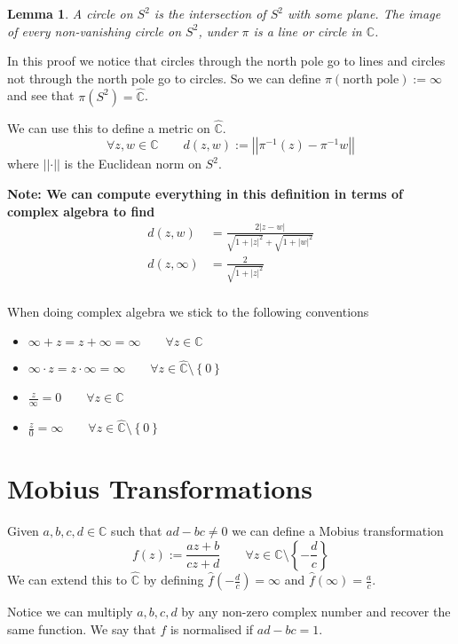 \documentclass[11pt]{article}
\newcommand{\defeq}{:=}
\newcommand{\abs}[1]{\left|#1\right|}
\newcommand{\norm}[1]{\left|\left|#1\right|\right|}
\newcommand{\C}{\mathbb{C}}
\newcommand{\mdf}[1]{{\color{red} #1}}
\newenvironment{note}
	{\begin{mdframed}[backgroundcolor=white, linecolor=red, roundcorner=5pt, linewidth=1pt]\bfseries{Note:}\normalfont}
	{\end{mdframed}}
\newtheorem{lemma}[theorem]{Lemma}
\begin{document}
\begin{lemma}
A \mdf{circle on $S^2$} is the intersection of $S^2$ with some plane.
The image of every non-vanishing circle on $S^2$, under $\pi$ is a line or circle in $\C$.
\end{lemma}

In this proof we notice that circles through the north pole go to lines and circles not through the north pole go to circles.
So we can define $\pi(\text{north pole})\defeq\infty$ and see that $\pi(S^2)=\hat{\C}$.

We can use this to define a metric on $\hat{\C}$.
\[
	\forall z, w\in \C \quad\quad d(z, w)\defeq\norm{\pi^{-1}(z) - \pi^{-1}w}
\]
where $\norm{\cdot}$ is the Euclidean norm on $S^2$.

\begin{note}
We can compute everything in this definition in terms of complex algebra to find
\begin{align*}
	d(z, w) &= \frac{2\abs{z-w}}{\sqrt{1+\abs{z}^2}+\sqrt{1+\abs{w}^2}}\\	
	d(z, \infty) &= \frac{2}{\sqrt{1+\abs{z}^2}}\\	
\end{align*}
\end{note}
When doing complex algebra we stick to the following conventions
\begin{itemize}
	\item $\infty + z = z + \infty = \infty \quad\quad\forall z\in\C$
	\item $\infty \cdot z = z \cdot \infty = \infty \quad\quad\forall z\in\hat{\C}\setminus\left\{0\right\}$
	\item $\frac{z}{\infty}=0 \quad\quad\forall z\in\C$
	\item $\frac{z}{0}=\infty \quad\quad\forall z\in\hat{\C}\setminus\left\{0\right\}$
\end{itemize}
\section{Mobius Transformations}

Given $a, b, c, d\in \C$ such that $ad-bc\neq 0$ we can define a \mdf{Mobius transformation}
\[
	f(z)\defeq\frac{az+b}{cz+d}\quad\quad\forall z\in\C\setminus\left\{-\frac{d}{c}\right\}
\]
We can extend this to $\hat{\C}$ by defining $\hat{f}(-\frac{d}{c})=\infty$ and $\hat{f}(\infty)=\frac{a}{c}$.

Notice we can multiply $a, b, c, d$ by any non-zero complex number and recover the same function.
We say that $f$ is \mdf{normalised} if $ad-bc=1$.
\end{document}
